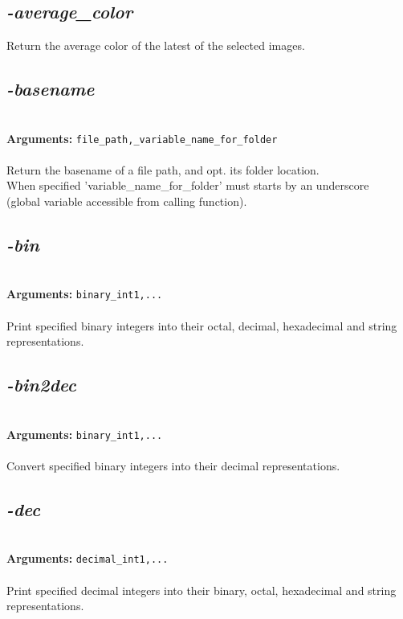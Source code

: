 \documentclass[a4paper,11pt,twoside]{book}
\begin{document}
\subsection{\emph{-average\_color} }\vspace*{-0.5em}
Return the average color of the latest of the selected images.


\subsection{\emph{-basename} }\vspace*{-0.5em}
~\\\textbf{Arguments: } 
{\small \texttt{file\_path,\_variable\_name\_for\_folder}}\\~\\
Return the basename of a file path, and opt. its folder location.
~\\When specified 'variable\_name\_for\_folder' must starts by an underscore
~\\(global variable accessible from calling function).


\subsection{\emph{-bin} }\vspace*{-0.5em}
~\\\textbf{Arguments: } 
{\small \texttt{binary\_int1,...}}\\~\\
Print specified binary integers into their octal, decimal, hexadecimal and string representations.


\subsection{\emph{-bin2dec} }\vspace*{-0.5em}
~\\\textbf{Arguments: } 
{\small \texttt{binary\_int1,...}}\\~\\
Convert specified binary integers into their decimal representations.


\subsection{\emph{-dec} }\vspace*{-0.5em}
~\\\textbf{Arguments: } 
{\small \texttt{decimal\_int1,...}}\\~\\
Print specified decimal integers into their binary, octal, hexadecimal and string representations.
\end{document}
